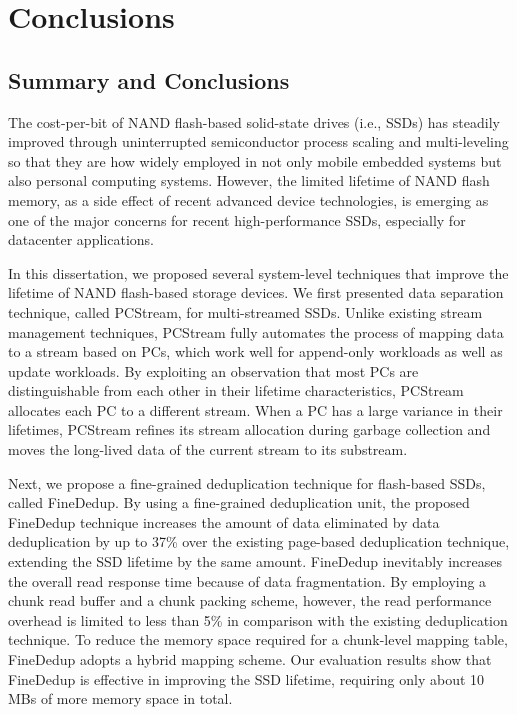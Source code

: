 
\chapter{Conclusions}
\label{chap:Conclusions}

\section{Summary and Conclusions}
The cost-per-bit of NAND flash-based solid-state drives (i.e., SSDs) has 
steadily improved through uninterrupted semiconductor process scaling and 
multi-leveling so that they are how widely employed in not only mobile embedded 
systems but also personal computing systems.
However, the limited lifetime of NAND flash memory, as a side effect of recent 
advanced device technologies, is emerging as one of the major concerns for 
recent high-performance SSDs, especially for datacenter applications.

In this dissertation, we proposed several system-level techniques that improve
the lifetime of NAND flash-based storage devices. We first presented
data separation technique, called PCStream, for multi-streamed SSDs.
Unlike existing stream management techniques, \textsf{\small PCStream} fully automates 
the process of mapping data to a stream based on PCs, 
which work well for append-only workloads as well as update workloads.  
By exploiting an observation that most PCs are distinguishable from each other 
in their lifetime characteristics, \textsf{\small PCStream} allocates each PC to a different stream.  
When a PC has a large variance in their lifetimes, \textsf{\small PCStream} refines its stream allocation 
during garbage collection and moves the long-lived data of the current stream to its substream.  

Next, 
we propose a fine-grained deduplication technique for flash-based SSDs, called FineDedup.
By using a fine-grained deduplication unit,
the proposed FineDedup technique increases the amount of data eliminated 
by data deduplication by up to 37\% over the existing page-based deduplication technique,
extending the SSD lifetime by the same amount.
FineDedup inevitably increases the overall read response time because of data fragmentation.
By employing a chunk read buffer and a chunk packing scheme,
however, the read performance overhead is limited to less than 5\% 
in comparison with the existing deduplication technique.
To reduce the memory space required for a chunk-level mapping table,
FineDedup adopts a hybrid mapping scheme.
Our evaluation results show that 
FineDedup is effective in improving the SSD lifetime,
requiring only about 10 MBs of more memory space in total.

